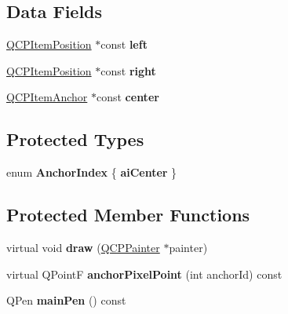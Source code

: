 \subsection*{Data Fields}
\begin{DoxyCompactItemize}
\item 
\hypertarget{classQCPItemBracket_af6cc6d27d96171778c6927d6edce48b0}{\hyperlink{classQCPItemPosition}{Q\-C\-P\-Item\-Position} $\ast$const {\bfseries left}}\label{classQCPItemBracket_af6cc6d27d96171778c6927d6edce48b0}

\item 
\hypertarget{classQCPItemBracket_afa6c1360b05a50c4e0df37b3cebab6be}{\hyperlink{classQCPItemPosition}{Q\-C\-P\-Item\-Position} $\ast$const {\bfseries right}}\label{classQCPItemBracket_afa6c1360b05a50c4e0df37b3cebab6be}

\item 
\hypertarget{classQCPItemBracket_a2dbcabdf5f467f28be12a7b25962ffca}{\hyperlink{classQCPItemAnchor}{Q\-C\-P\-Item\-Anchor} $\ast$const {\bfseries center}}\label{classQCPItemBracket_a2dbcabdf5f467f28be12a7b25962ffca}

\end{DoxyCompactItemize}
\subsection*{Protected Types}
\begin{DoxyCompactItemize}
\item 
enum {\bfseries Anchor\-Index} \{ {\bfseries ai\-Center}
 \}
\end{DoxyCompactItemize}
\subsection*{Protected Member Functions}
\begin{DoxyCompactItemize}
\item 
\hypertarget{classQCPItemBracket_a8343cf0559c64886add7aa7f4b22f1a6}{virtual void {\bfseries draw} (\hyperlink{classQCPPainter}{Q\-C\-P\-Painter} $\ast$painter)}\label{classQCPItemBracket_a8343cf0559c64886add7aa7f4b22f1a6}

\item 
\hypertarget{classQCPItemBracket_ac76827e3acba5faee81f149af4047a39}{virtual Q\-Point\-F {\bfseries anchor\-Pixel\-Point} (int anchor\-Id) const }\label{classQCPItemBracket_ac76827e3acba5faee81f149af4047a39}

\item 
\hypertarget{classQCPItemBracket_a8df4ad873bf88a4a7bfb9bbbd490e495}{Q\-Pen {\bfseries main\-Pen} () const }\label{classQCPItemBracket_a8df4ad873bf88a4a7bfb9bbbd490e495}

\end{DoxyCompactItemize}
